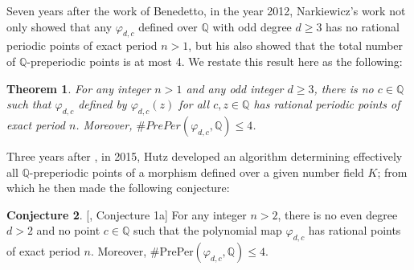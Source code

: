 \documentclass{article}
\theoremstyle{plain}
\newtheorem{thm}{Theorem}[section]
\theoremstyle{definition}
\newtheorem{conj}[thm]{Conjecture}
\begin{document}
Seven years after the work of Benedetto, in the year 2012, Narkiewicz's work \cite{Narkie} not only showed that any $\varphi_{d,c}$ defined over $\mathbb{Q}$ with odd degree $d\geq 3$ has no rational periodic points of exact period $n > 1$, but his also showed that the total number of $\mathbb{Q}$-preperiodic points is at most 4. We restate this result here as the following: 

\begin{thm} \label{theorem 3.2.1}\cite{Narkie}
For any integer $n > 1$ and any odd integer $d\geq 3$, there is no $c\in \mathbb{Q}$ such that $\varphi_{d,c}$ defined by $\varphi_{d, c}(z)$ for all $c,z \in \mathbb{Q}$ has rational periodic points of exact period $n$. Moreover, $\#PrePer(\varphi_{d, c}, \mathbb{Q}) \leq 4$. 
\end{thm} 

Three years after \cite{Narkie}, in 2015, Hutz \cite{Hutz} developed an algorithm determining effectively all $\mathbb{Q}$-preperiodic points of a morphism defined over a given number field $K$; from which he then made the following conjecture: 

\begin{conj} \label{conjecture 3.2.1}[\cite{Hutz}, Conjecture 1a]
For any integer $n > 2$, there is no even degree $d > 2$ and no point $c \in \mathbb{Q}$ such that the polynomial map $\varphi_{d, c}$ has rational points of exact period $n$.
Moreover, \#PrePer$(\varphi_{d, c}, \mathbb{Q}) \leq 4$. 
\end{conj}
\end{document}
